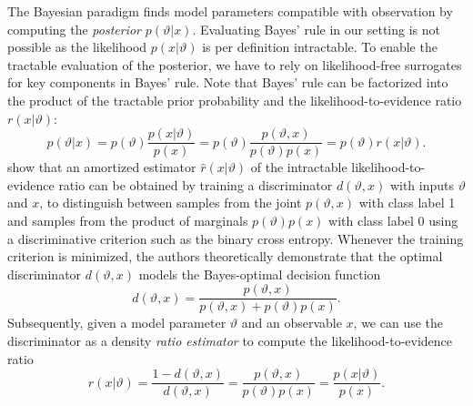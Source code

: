\documentclass{article}
\begin{document}
The Bayesian paradigm finds model parameters compatible with observation by
computing the \emph{posterior} $p(\vartheta\vert x)$.
Evaluating Bayes' rule in our setting is not possible as the
likelihood $p(x\vert\vartheta)$ is per definition intractable.
To enable the tractable evaluation
of the posterior, we have to rely on likelihood-free surrogates
for key components in Bayes' rule. Note that Bayes' rule can be factorized into
the product of the tractable prior probability and the
likelihood-to-evidence ratio $r(x\vert\vartheta)$:
\begin{equation}
    p(\vartheta\vert x) = p(\vartheta)\frac{p(x\vert\vartheta)}{p(x)} = p(\vartheta)\frac{p(\vartheta,x)}{p(\vartheta)p(x)} = p(\vartheta)r(x\vert\vartheta).
\end{equation}
\citet{2019arXiv190304057H} show that an amortized estimator $\hat{r}(x\vert\vartheta)$
of the intractable likelihood-to-evidence ratio can be obtained
by training a discriminator $d(\vartheta, x)$ with inputs $\vartheta$ and $x$, to distinguish between samples from the
joint $p(\vartheta, x)$ with class label 1 and samples from the product of marginals $p(\vartheta)p(x)$ with class label 0 using a discriminative criterion such
as the binary cross entropy.
Whenever the training criterion is minimized, the authors theoretically
demonstrate that the optimal discriminator $d(\vartheta, x)$
models the Bayes-optimal decision function
\begin{equation}
  d(\vartheta, x) = \frac{p(\vartheta, x)}{p(\vartheta,x) + p(\vartheta)p(x)}.
\end{equation}
Subsequently, given a model parameter $\vartheta$ and an observable $x$,
we can use the discriminator as a density \emph{ratio estimator}
to compute the likelihood-to-evidence ratio
\begin{equation}
  r(x\vert\vartheta) = \frac{1 - d(\vartheta,x)}{d(\vartheta,x)} = \frac{p(\vartheta, x)}{p(\vartheta)p(x)} = \frac{p(x\vert\vartheta)}{p(x)} .
\end{equation}
\end{document}
